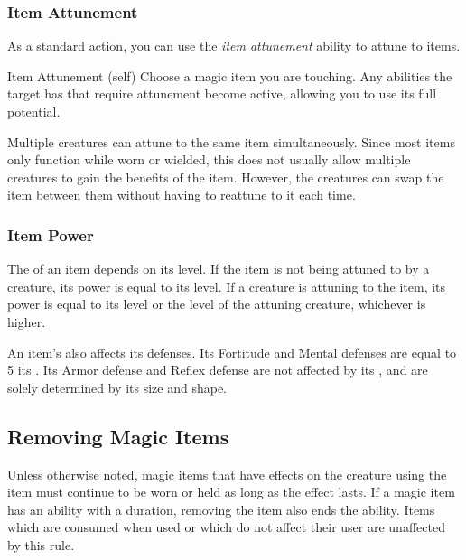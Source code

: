         \subsubsection{Item Attunement}\label{Item Attunement}

            As a standard action, you can use the \textit{item attunement} ability to attune to items.

            \begin{attuneability}{Item Attunement}
                 (self)
                \rankline
                Choose a magic item you are touching.
                Any abilities the target has that require attunement become active, allowing you to use its full potential.
            \end{attuneability}

             Multiple creatures can attune to the same item simultaneously.
            Since most items only function while worn or wielded, this does not usually allow multiple creatures to gain the benefits of the item.
            However, the creatures can swap the item between them without having to reattune to it each time.

    \subsubsection{Item Power}\label{Item Power}
        The  of an item depends on its level.
        If the item is not being attuned to by a creature, its power is equal to its level.
        If a creature is attuning to the item, its power is equal to its level or the level of the attuning creature, whichever is higher.

        An item's  also affects its defenses.
        Its Fortitude and Mental defenses are equal to 5 \add its .
        Its Armor defense and Reflex defense are not affected by its , and are solely determined by its size and shape.

    \subsection{Removing Magic Items}
        Unless otherwise noted, magic items that have effects on the creature using the item must continue to be worn or held as long as the effect lasts.
        If a magic item has an ability with a duration, removing the item also ends the ability.
        Items which are consumed when used or which do not affect their user are unaffected by this rule.

